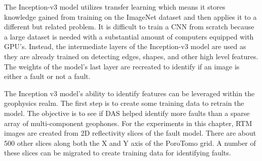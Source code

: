 The Inception-v3 model utilizes transfer learning which means it stores knowledge gained from training on the ImageNet dataset and then applies it to a different but related problem. It is difficult to train a CNN from scratch because a large dataset is needed with a substantial amount of computers equipped with GPU's. Instead, the intermediate layers of the Inception-v3 model are used as they are already trained on detecting edges, shapes, and other high level features. The weights of the model's last layer are recreated to identify if an image is either a fault or not a fault.


%

The Inception v3 model's ability to identify features can be leveraged within the geophysics realm. The first step is to create some training data to retrain the model. The objective is to see if DAS helped identify more faults than a sparse array of multi-component geophones. For the experiments in this chapter, RTM images are created from 2D reflectivity slices of the \citet{siler2013three} fault model. There are about 500 other slices along both the X and Y axis of the PoroTomo grid. A number of these slices can be migrated to create training data for identifying faults.

